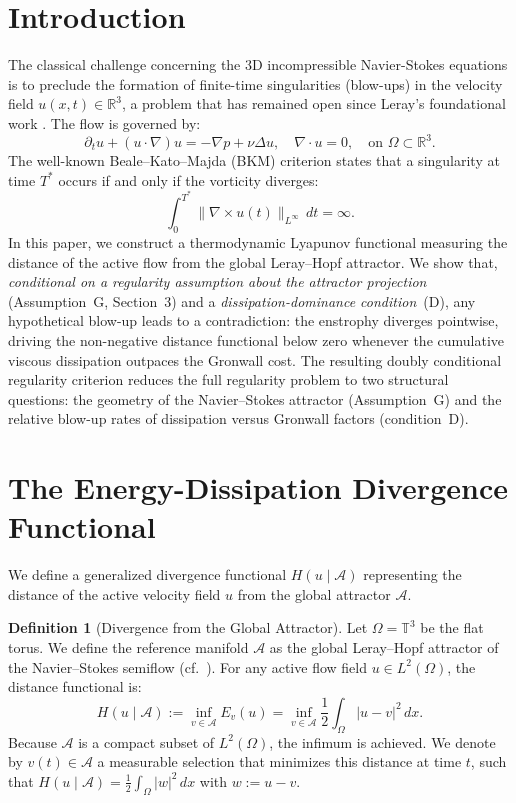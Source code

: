 \documentclass[12pt,a4paper]{article}
\theoremstyle{definition}
\newtheorem{definition}{Definition}[section]
\theoremstyle{plain}
\theoremstyle{remark}
\begin{document}
\section{Introduction}
The classical challenge concerning the 3D incompressible Navier-Stokes equations is to preclude the formation of finite-time singularities (blow-ups) in the velocity field $u(x,t) \in \mathbb{R}^3$, a problem that has remained open since Leray's foundational work \cite{Leray1934}. The flow is governed by:
\begin{equation}
    \partial_t u + (u \cdot \nabla) u = -\nabla p + \nu \Delta u, \quad \nabla \cdot u = 0, \quad \text{on } \Omega \subset \mathbb{R}^3.
\end{equation}
The well-known Beale--Kato--Majda (BKM) criterion \cite{BealeKatoMajda1984} states that a singularity at time $T^*$ occurs if and only if the vorticity diverges:
\begin{equation}
    \int_0^{T^*} \|\nabla \times u(t)\|_{L^\infty} \, dt = \infty.
\end{equation}
In this paper, we construct a thermodynamic Lyapunov functional measuring the distance of the active flow from the global Leray--Hopf attractor. We show that, \emph{conditional on a regularity assumption about the attractor projection} (Assumption~G, Section~3) and a \emph{dissipation-dominance condition}~(D), any hypothetical blow-up leads to a contradiction: the enstrophy diverges pointwise, driving the non-negative distance functional below zero whenever the cumulative viscous dissipation outpaces the Gronwall cost. The resulting doubly conditional regularity criterion reduces the full regularity problem to two structural questions: the geometry of the Navier--Stokes attractor (Assumption~G) and the relative blow-up rates of dissipation versus Gronwall factors (condition~D).

\section{The Energy-Dissipation Divergence Functional}
We define a generalized divergence functional $H(u \mid \mathcal{A})$ representing the distance of the active velocity field $u$ from the global attractor $\mathcal{A}$.

\begin{definition}[Divergence from the Global Attractor]
Let $\Omega = \mathbb{T}^3$ be the flat torus. We define the reference manifold $\mathcal{A}$ as the global Leray--Hopf attractor of the Navier--Stokes semiflow (cf.\ \cite{FoiasManleyRosaTemam2001,Temam2001}). For any active flow field $u \in L^2(\Omega)$, the distance functional is:
\begin{equation}
    H(u \mid \mathcal{A}) := \inf_{v \in \mathcal{A}} E_{v}(u) = \inf_{v \in \mathcal{A}} \frac{1}{2} \int_\Omega |u - v|^2 \, dx.
\end{equation}
Because $\mathcal{A}$ is a compact subset of $L^2(\Omega)$, the infimum is achieved. We denote by $v(t) \in \mathcal{A}$ a measurable selection that minimizes this distance at time $t$, such that $H(u \mid \mathcal{A}) = \frac{1}{2} \int_\Omega |w|^2 \, dx$ with $w := u - v$.
\end{definition}
\end{document}
